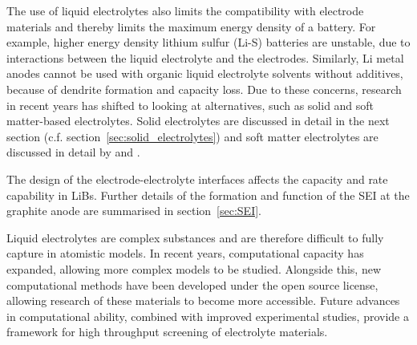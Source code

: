 \documentclass[../main.tex]{subfiles}
\begin{document}
\begin{itemize}
    The use of liquid electrolytes also limits the compatibility with electrode materials and thereby limits the maximum energy density of a battery.\cite{Liu2019_e_den} For example, higher energy density lithium sulfur (Li-S) batteries are unstable, due to interactions between the liquid electrolyte and the electrodes.\cite{Zhang2013_PS} Similarly, Li metal anodes cannot be used with organic liquid electrolyte solvents without additives,\cite{Wu2019_Li_electrolyte} because of dendrite formation and capacity loss.\cite{Kushima2017, Lin2019_li_corrosion} Due to these concerns, research in recent years has shifted to looking at alternatives, such as solid and soft matter-based electrolytes.\cite{Zhang2018se_review} Solid electrolytes are discussed in detail in the next section (c.f. section~\ref{sec:solid_electrolytes}) and soft matter electrolytes are discussed in detail by \citeauthor{Hallinan_2013} and \citeauthor{popovic2011chemistry}.\cite{Hallinan_2013,popovic2011chemistry}
\end{itemize}
    
The design of the electrode-electrolyte interfaces affects the capacity and rate capability in LiBs.\cite{Xu2011,Xu2014} \cite{Xu2004, Goodenough2010, Yu2017} \cite{Wang2018} Further details of the formation and function of the SEI at the graphite anode are summarised in section~\ref{sec:SEI}.
    
Liquid electrolytes are complex substances and are therefore difficult to fully capture in atomistic models. In recent years, computational capacity has expanded, allowing more complex models to be studied. Alongside this, new computational methods have been developed under the open source license, allowing research of these materials to become more accessible.\cite{merlet_highly_2013, borodin_interfacial_2014, Simoncelli_2018,marin-lafleche_metalwalls_2020} Future advances in computational ability, combined with improved experimental studies, provide a framework for high throughput screening of electrolyte materials.
\end{document}
